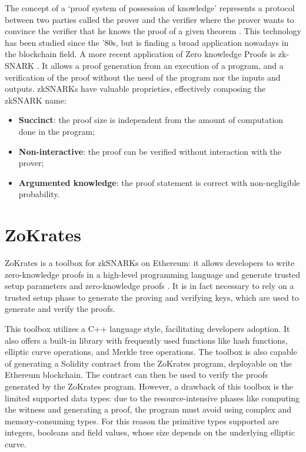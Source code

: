 The concept of a `proof system of possession of knowledge' represents a protocol between two parties called the prover and the verifier where the prover wants to convince the verifier that he knows the proof of a given theorem \cite{de_santis_zero-knowledge_1992}. This technology has been studied since the '80s, but is finding a broad application nowadays in the blockchain field. A more recent application of Zero knowledge Proofs is zk-SNARK \cite{bitansky_extractable_2012}. It allows a proof generation from an execution of a program, and a verification of the proof without the need of the program nor the inputs and outputs. zkSNARKs have valuable proprieties, effectively composing the zkSNARK name:
\begin{itemize}
    \item \textbf{Succinct}: the proof size is independent from the amount of computation done in the program;
          \vspace{-0.11in}
    \item \textbf{Non-interactive}: the proof can be verified without interaction with the prover;
          \vspace{-0.11in}
    \item \textbf{Argumented knowledge}: the proof statement is correct with non-negligible probability.
          \vspace{-0.11in}
\end{itemize}

\section{ZoKrates}

ZoKrates is a toolbox for zkSNARKs on Ethereum: it allows developers to write zero-knowledge proofs in a high-level programming language and generate trusted setup parameters and zero-knowledge proofs \cite{eberhardt_ZoKrates_2018}. It is in fact necessary to rely on a trusted setup phase to generate the proving and verifying keys, which are used to generate and verify the proofs.

This toolbox utilizes a C++ language style, facilitating developers adoption. It also offers a built-in library with frequently used functions like hash functions, elliptic curve operations, and Merkle tree operations. The toolbox is also capable of generating a Solidity contract from the ZoKrates program, deployable on the Ethereum blockchain. The contract can then be used to verify the proofs generated by the ZoKrates program. However, a drawback of this toolbox is the limited supported data types: due to the resource-intensive phases like computing the witness and generating a proof, the program must avoid using complex and memory-consuming types. For this reason the primitive types supported are integers, booleans and field values, whose size depends on the underlying elliptic curve.

